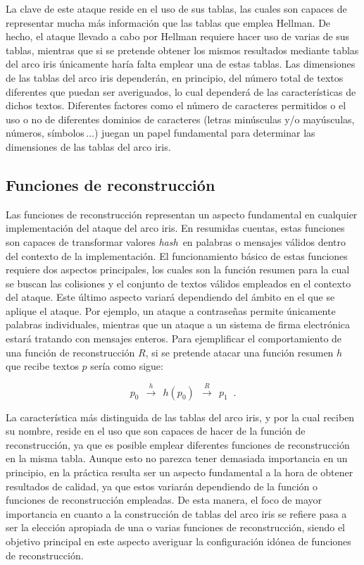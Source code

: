 \documentclass[12pt,spanish,listoffigures,listoftables,listofalgorithms]{tfgetsinf}
\newcommand{\hash}{\textit{hash}}
\begin{document}
La clave de este ataque reside en el uso de sus tablas, las cuales son capaces de representar mucha más información que las tablas que emplea Hellman. De hecho, el ataque llevado a cabo por Hellman requiere hacer uso de varias de sus tablas, mientras que si se pretende obtener los mismos resultados mediante tablas del arco iris únicamente haría falta emplear una de estas tablas. Las dimensiones de las tablas del arco iris dependerán, en principio, del número total de textos diferentes que puedan ser averiguados, lo cual dependerá de las características de dichos textos. Diferentes factores como el número de caracteres permitidos o el uso o no de diferentes dominios de caracteres (letras minúsculas y/o mayúsculas, números, símbolos$\, \dots$) juegan un papel fundamental para determinar las dimensiones de las tablas del arco iris. 

\subsection{Funciones de reconstrucción}

Las funciones de reconstrucción representan un aspecto fundamental en cualquier implementación del ataque del arco iris. En resumidas cuentas, estas funciones son capaces de transformar valores \hash~en palabras o mensajes válidos dentro del contexto de la implementación. El funcionamiento básico de estas funciones requiere dos aspectos principales, los cuales son la función resumen para la cual se buscan las colisiones y el conjunto de textos válidos empleados en el contexto del ataque. Este último aspecto variará dependiendo del ámbito en el que se aplique el ataque. Por ejemplo, un ataque a contraseñas permite únicamente palabras individuales, mientras que un ataque a un sistema de firma electrónica estará tratando con mensajes enteros. Para ejemplificar el comportamiento de una función de reconstrucción $R$, si se pretende atacar una función resumen $h$ que recibe textos $p$ sería como sigue:

\begin{center}
	\begin{equation}
		\tag{3}
		p_0~~ \xrightarrow{h}~~ h(p_0)~~ \xrightarrow{R}~~ p_1\;\;.
		\label{reconstrucción}
	\end{equation}
\end{center}

La característica más distinguida de las tablas del arco iris, y por la cual reciben su nombre, reside en el uso que son capaces de hacer de la función de reconstrucción, ya que es posible emplear diferentes funciones de reconstrucción en la misma tabla. Aunque esto no parezca tener demasiada importancia en un principio, en la práctica resulta ser un aspecto fundamental a la hora de obtener resultados de calidad, ya que estos variarán dependiendo de la función o funciones de reconstrucción empleadas. De esta manera, el foco de mayor importancia en cuanto a la construcción de tablas del arco iris se refiere pasa a ser la elección apropiada de una o varias funciones de reconstrucción, siendo el objetivo principal en este aspecto averiguar la configuración idónea de funciones de reconstrucción. 
\end{document}
